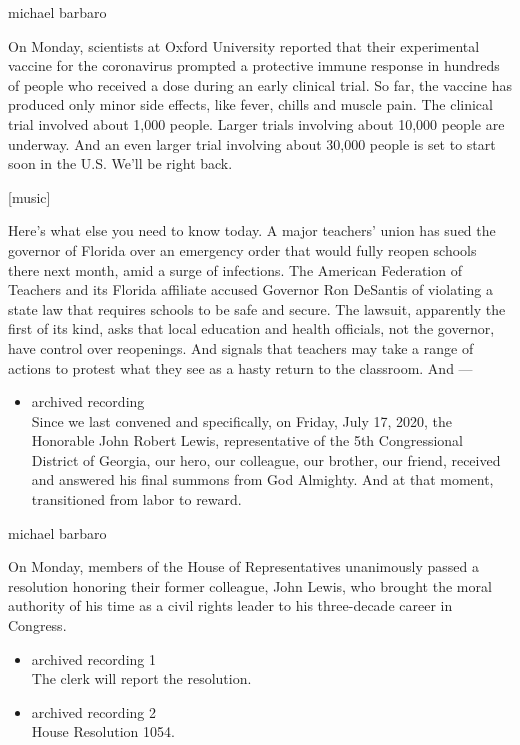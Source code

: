 michael barbaro

On Monday, scientists at Oxford University reported that their
experimental vaccine for the coronavirus prompted a protective immune
response in hundreds of people who received a dose during an early
clinical trial. So far, the vaccine has produced only minor side
effects, like fever, chills and muscle pain. The clinical trial involved
about 1,000 people. Larger trials involving about 10,000 people are
underway. And an even larger trial involving about 30,000 people is set
to start soon in the U.S. We'll be right back.

{[}music{]}

Here's what else you need to know today. A major teachers' union has
sued the governor of Florida over an emergency order that would fully
reopen schools there next month, amid a surge of infections. The
American Federation of Teachers and its Florida affiliate accused
Governor Ron DeSantis of violating a state law that requires schools to
be safe and secure. The lawsuit, apparently the first of its kind, asks
that local education and health officials, not the governor, have
control over reopenings. And signals that teachers may take a range of
actions to protest what they see as a hasty return to the classroom. And
---

\begin{itemize}
\tightlist
\item
  archived recording\\
  Since we last convened and specifically, on Friday, July 17, 2020, the
  Honorable John Robert Lewis, representative of the 5th Congressional
  District of Georgia, our hero, our colleague, our brother, our friend,
  received and answered his final summons from God Almighty. And at that
  moment, transitioned from labor to reward.
\end{itemize}

michael barbaro

On Monday, members of the House of Representatives unanimously passed a
resolution honoring their former colleague, John Lewis, who brought the
moral authority of his time as a civil rights leader to his three-decade
career in Congress.

\begin{itemize}
\item
  archived recording 1\\
  The clerk will report the resolution.
\item
  archived recording 2\\
  House Resolution 1054.
\end{itemize}

